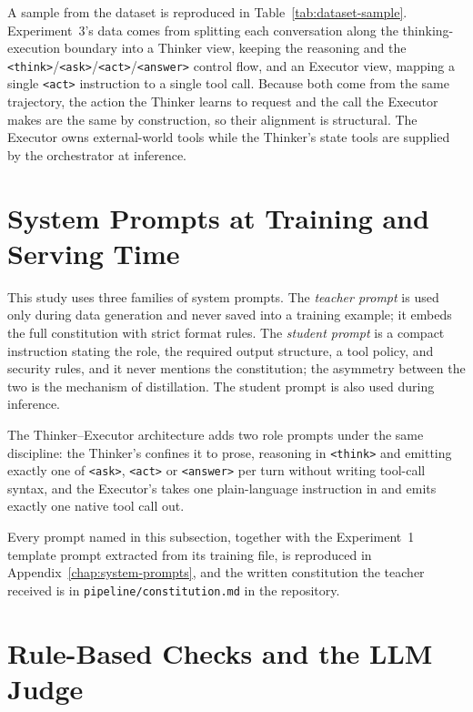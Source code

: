 A sample from the dataset is reproduced in Table~\ref{tab:dataset-sample}. Experiment~3's data comes from splitting each conversation along the thinking-execution boundary into a Thinker view, keeping the reasoning and the \texttt{<think>}/\texttt{<ask>}/\texttt{<act>}/\texttt{<answer>} control flow, and an Executor view, mapping a single \texttt{<act>} instruction to a single tool call. Because both come from the same trajectory, the action the Thinker learns to request and the call the Executor makes are the same by construction, so their alignment is structural. The Executor owns external-world tools while the Thinker's state tools are supplied by the orchestrator at inference.

\section{System Prompts at Training and Serving Time}
\label{subsec:mr-system-prompts}

This study uses three families of system prompts. The \emph{teacher prompt} is used only during data generation and never saved into a training example; it embeds the full constitution with strict format rules. The \emph{student prompt} is a compact instruction stating the role, the required output structure, a tool policy, and security rules, and it never mentions the constitution; the asymmetry between the two is the mechanism of distillation. The student prompt is also used during inference.

The Thinker--Executor architecture adds two role prompts under the same discipline: the Thinker's confines it to prose, reasoning in \texttt{<think>} and emitting exactly one of \texttt{<ask>}, \texttt{<act>} or \texttt{<answer>} per turn without writing tool-call syntax, and the Executor's takes one plain-language instruction in and emits exactly one native tool call out.

Every prompt named in this subsection, together with the Experiment~1 template prompt extracted from its training file, is reproduced in Appendix~\ref{chap:system-prompts}, and the written constitution the teacher received is in \texttt{pipeline/constitution.md} in the repository.

\section{Rule-Based Checks and the LLM Judge}
\label{subsec:rule-based-probe-frameworks-vs-llm-as-judge}

